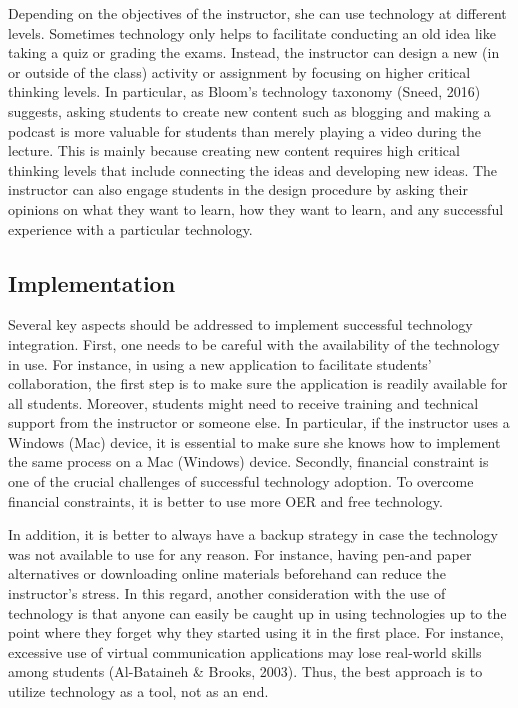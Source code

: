 \documentclass{book}
\begin{document}
Depending on the objectives of the instructor, she can use technology at
different levels. Sometimes technology only helps to facilitate conducting an
old idea like taking a quiz or grading the exams. Instead, the instructor can
design a new (in or outside of the class) activity or assignment by focusing
on higher critical thinking levels. In particular, as Bloom's technology
taxonomy (Sneed, 2016) suggests, asking students to create new content such as
blogging and making a podcast is more valuable for students than merely
playing a video during the lecture. This is mainly because creating new
content requires high critical thinking levels that include connecting the
ideas and developing new ideas. The instructor can also engage students in the
design procedure by asking their opinions on what they want to learn, how they
want to learn, and any successful experience with a particular technology.

\hypertarget{implementation}{%
\subsection{Implementation}\label{implementation}}

Several key aspects should be addressed to implement successful technology
integration. First, one needs to be careful with the availability of the
technology in use. For instance, in using a new application to facilitate
students' collaboration, the first step is to make sure the application is
readily available for all students. Moreover, students might need to receive
training and technical support from the instructor or someone else. In
particular, if the instructor uses a Windows (Mac) device, it is essential to
make sure she knows how to implement the same process on a Mac (Windows)
device. Secondly, financial constraint is one of the crucial challenges of
successful technology adoption. To overcome financial constraints, it is
better to use more OER and free technology.

In addition, it is better to always have a backup strategy in case the
technology was not available to use for any reason. For instance, having
pen-and paper alternatives or downloading online materials beforehand can
reduce the instructor's stress. In this regard, another consideration with the
use of technology is that anyone can easily be caught up in using technologies
up to the point where they forget why they started using it in the first
place. For instance, excessive use of virtual communication applications may
lose real-world skills among students (Al-Bataineh \& Brooks, 2003). Thus, the
best approach is to utilize technology as a tool, not as an end.
\end{document}
